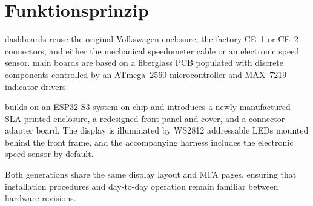 \chapter{Funktionsprinzip} \label{ch:operating-principle}

\ReplicaGenOne{} dashboards reuse the original Volkswagen enclosure, the factory CE~1 or CE~2 connectors, and either the mechanical speedometer cable or an electronic speed sensor.
\ReplicaGenOneShort{} main boards are based on a fiberglass PCB populated with discrete components controlled by an ATmega~2560 microcontroller and MAX~7219 indicator drivers.

\ReplicaNextLong{} builds on an ESP32-S3 system-on-chip and introduces a newly manufactured SLA-printed enclosure, a redesigned front panel and cover, and a connector adapter board.
The \ReplicaNextShort{} display is illuminated by WS2812 addressable LEDs mounted behind the front frame, and the accompanying harness includes the electronic speed sensor by default.

Both generations share the same display layout and MFA pages, ensuring that installation procedures and day-to-day operation remain familiar between hardware revisions.
